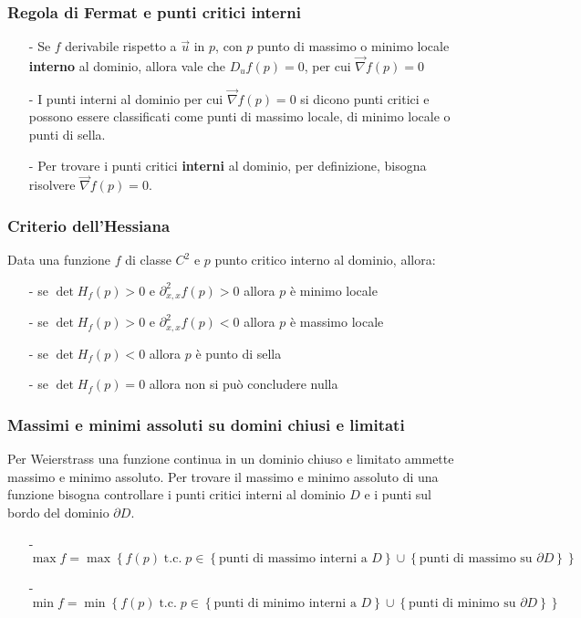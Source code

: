 \documentclass[a4paper]{article}
\newcommand\tc{\text{t.c.}}   %
\newcommand\nab{\vec{\nabla}} %
\begin{document}
\subsubsection*{Regola di Fermat e punti critici interni}
\begin{itemize}[topsep=3pt, itemsep=0pt]
	\item[-] Se \(f\) derivabile rispetto a \(\vec{u}\) in \(p\), con \(p\) punto di massimo o minimo locale \textbf{interno}
	al dominio, allora vale che \(D_u f(p) = 0\), per cui \(\nab f(p) = 0\)
	\item[-] I punti interni al dominio per cui \(\nab f(p) = 0\) si dicono punti critici e possono essere classificati
	come punti di massimo locale, di minimo locale o punti di sella.
	\item[-] Per trovare i punti critici \textbf{interni} al dominio, per definizione, bisogna risolvere \(\nab f(p) = 0\).
\end{itemize}

\subsubsection*{Criterio dell'Hessiana}
Data una funzione \(f\) di classe \(C^2\) e \(p\) punto critico interno al dominio, allora:
\begin{itemize}[topsep=3pt, itemsep=0pt]
	\item[-] se \(\det H_f(p) > 0\) e \(\partial^2_{x,x}f(p) > 0\) allora \(p\) è minimo locale
	\item[-] se \(\det H_f(p) > 0\) e \(\partial^2_{x,x}f(p) < 0\) allora \(p\) è massimo locale
	\item[-] se \(\det H_f(p) < 0\) allora \(p\) è punto di sella
	\item[-] se \(\det H_f(p) = 0\) allora non si può concludere nulla
\end{itemize}

\subsubsection*{Massimi e minimi assoluti su domini chiusi e limitati}
Per Weierstrass una funzione continua in un dominio chiuso e limitato ammette massimo e minimo assoluto. Per trovare il massimo e minimo
assoluto di una funzione bisogna controllare i punti critici interni al dominio \(D\) e i punti sul bordo del dominio \(\partial D\).

\begin{itemize}[topsep=3pt, itemsep=0pt]
	\item[-] \(\max f = \max \left\{ f(p) \; \tc \; p \in \left\{\text{punti di massimo interni a } D\right\} \cup \left\{\text{punti di massimo su } \partial D \right\} \right\}\)
	\item[-] \(\min f = \min \left\{ f(p) \; \tc \; p \in \left\{\text{punti di minimo interni a } D\right\} \cup \left\{\text{punti di minimo su } \partial D \right\} \right\}\)
\end{itemize}
\end{document}
